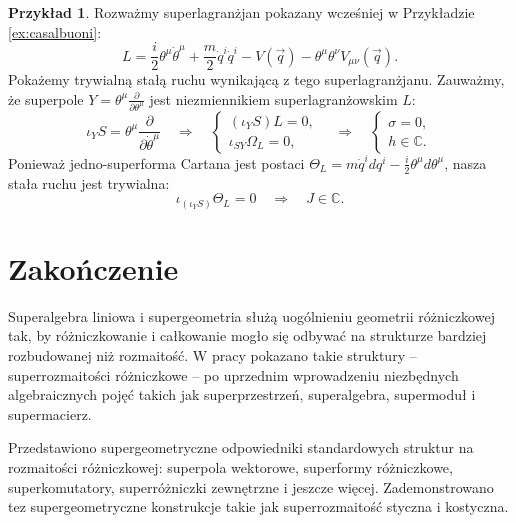\documentclass[11pt,a4paper]{report}
\theoremstyle{definition}
\newtheorem{example}[theorem]{Przykład}
\begin{document}
\begin{example}
 Rozważmy superlagranżjan pokazany wcześniej w Przykładzie \ref{ex:casalbuoni}:
 \begin{equation*}
  L = \frac{i}{2} \theta^\mu \dot{\theta}^\mu + \frac{m}{2} \dot{q}^i \dot{q}^i   - V(\overrightarrow{q}) - \theta^\mu \theta^\nu V_{\mu \nu} (\overrightarrow{q}).
 \end{equation*}
 Pokażemy trywialną stałą ruchu wynikającą z tego superlagranżjanu. Zauważmy, że superpole $Y=\theta^\mu \frac{\partial}{\partial \theta^\mu}$ jest niezmiennikiem superlagranżowskim $L$:
 \begin{equation*}
  \iota_Y S = \theta^\mu \frac{\partial}{\partial \dot \theta^\mu} \quad \Rightarrow \quad \left\{ \begin{array}{l}
   (\iota_Y S) L = 0, \\
   \iota_{SY} \Omega_L = 0,
   \end{array}\right. 
   \quad \Rightarrow \quad \left\{ \begin{array}{l}
   \sigma = 0, \\
   h \in \mathbb{C}.
   \end{array}\right.
 \end{equation*}
 Ponieważ jedno-superforma Cartana jest postaci $\Theta_L = m \dot q^i dq^i - \frac{i}{2} \theta^\mu d \theta^\mu$, nasza stała ruchu jest trywialna:
 \begin{equation*}
  \iota_{(\iota_Y S)} \Theta_L = 0 \quad \Rightarrow \quad J \in \mathbb{C}.
 \end{equation*}
\end{example}

\newpage
\chapter*{Zakończenie}
Superalgebra liniowa i supergeometria służą uogólnieniu geometrii różniczkowej tak, by różniczkowanie i całkowanie mogło się odbywać na strukturze bardziej rozbudowanej niż rozmaitość. W pracy pokazano takie struktury -- superrozmaitości różniczkowe -- po uprzednim wprowadzeniu niezbędnych algebraicznych pojęć takich jak superprzestrzeń, superalgebra, supermoduł i supermacierz.

Przedstawiono supergeometryczne odpowiedniki standardowych struktur na rozmaitości różniczkowej: superpola wektorowe, superformy różniczkowe, superkomutatory, superróżniczki zewnętrzne i jeszcze więcej. Zademonstrowano tez supergeometryczne konstrukcje takie jak superrozmaitość styczna i kostyczna.
\end{document}
